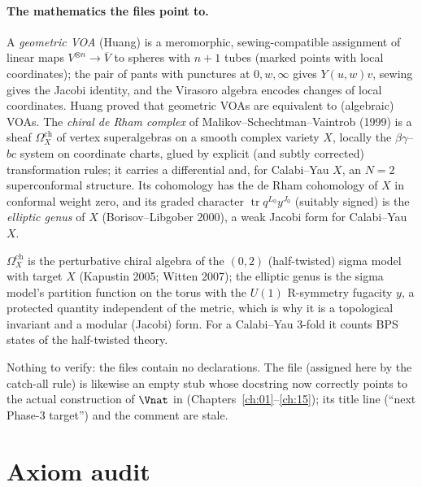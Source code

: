 \paragraph{The mathematics the files point to.} A \emph{geometric VOA} (Huang) is a meromorphic, sewing-compatible
assignment of linear maps $V^{\otimes n}\to\overline V$ to spheres with $n+1$ tubes (marked points with local
coordinates); the pair of pants with punctures at $0,w,\infty$ gives $Y(u,w)v$, sewing gives the Jacobi identity, and
the Virasoro algebra encodes changes of local coordinates. Huang proved that geometric VOAs are equivalent to
(algebraic) VOAs. The \emph{chiral de Rham complex} of Malikov--Schechtman--Vaintrob (1999) is a sheaf
$\Omega^{\mathrm{ch}}_X$ of vertex superalgebras on a smooth complex variety $X$, locally the $\beta\gamma$--$bc$ system on
coordinate charts, glued by explicit (and subtly corrected) transformation rules; it carries a differential and, for
Calabi--Yau $X$, an $N=2$ superconformal structure. Its cohomology has the de Rham cohomology of $X$ in conformal
weight zero, and its graded character $\operatorname{tr}q^{L_0}y^{J_0}$ (suitably signed) is the \emph{elliptic genus}
of $X$ (Borisov--Libgober 2000), a weak Jacobi form for Calabi--Yau $X$.

\begin{physics}
$\Omega^{\mathrm{ch}}_X$ is the perturbative chiral algebra of the $(0,2)$ (half-twisted) sigma model with target $X$
(Kapustin 2005; Witten 2007); the elliptic genus is the sigma model's partition function on the torus with the
$U(1)$ R-symmetry fugacity $y$, a protected quantity independent of the metric, which is why it is a topological
invariant and a modular (Jacobi) form. For a Calabi--Yau 3-fold it counts BPS states of the half-twisted theory.
\end{physics}

\begin{status}
Nothing to verify: the files contain no declarations. The file 
(assigned here by the catch-all rule) is likewise an empty stub whose docstring now correctly points to the actual
construction of $\Vnat$ in  (Chapters~\ref{ch:01}--\ref{ch:15}); its title line
(``next Phase-3 target'') and the comment  are stale.
\end{status}

\section{Axiom audit}\label{l19:sec:axioms}

